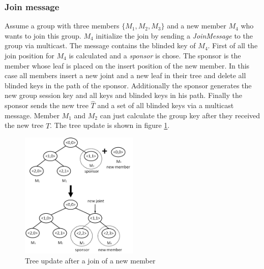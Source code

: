 \subsubsection{Join message}
Assume a group with three members $\{M_1, M_2, M_3\}$ and a new member $M_4$ who wants to join this group. $M_4$ initialize the join by sending a \textit{JoinMessage} to the group via multicast. The message contains the blinded key of $M_4$. First of all the join position for $M_4$ is calculated and a \textit{sponsor} is chose. The sponsor is the member whose leaf is placed on the insert position of the new member. In this case all members insert a new joint and a new leaf in their tree and delete all blinded keys in the path of the sponsor. Additionally the sponsor generates the new group session key and all keys and blinded keys in his path. Finally the sponsor sends the new tree $\widehat{T}$ and a set of all blinded keys via a multicast message. Member $M_1$ and $M_2$ can just calculate the group key after they received the new tree $\widehat{T}$. The tree update is shown in figure \ref{fig:tgdh_join}.
\begin{figure}[!h]
\centering\includegraphics[width=0.5\textwidth]{Images/tgdh_join}
\caption{Tree update after a join of a new member}
\label{fig:tgdh_join}
\end{figure}

